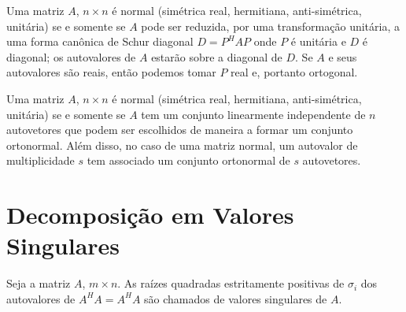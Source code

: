 \documentclass[10pt,a4paper]{article}
\begin{document}
\begin{theorem}\label{Schur Diagonal}
	Uma matriz $A$, $n \times n$ é normal (simétrica real, hermitiana, anti-simétrica, unitária) se e somente se $A$ pode ser reduzida, por uma transformação unitária, a uma forma canônica de Schur diagonal $D = P^HAP$ onde $P$ é unitária e $D$ é diagonal; os autovalores de $A$ estarão sobre a diagonal de $D$. Se $A$ e seus autovalores são reais, então podemos tomar $P$ real e, portanto ortogonal.
\end{theorem}

\begin{theorem}
	Uma matriz $A$, $n \times n$ é normal (simétrica real, hermitiana, anti-simétrica, unitária) se e somente se $A$ tem um conjunto linearmente independente de $n$ autovetores que podem ser escolhidos de maneira a formar um conjunto ortonormal. Além disso, no caso de uma matriz normal, um autovalor de multiplicidade $s$ tem associado um conjunto ortonormal de $s$ autovetores.
\end{theorem}

\section{Decomposição em Valores Singulares}

\begin{definition}\label{Valores Singulares} Seja a matriz $A$, $m \times n$. As raízes quadradas estritamente positivas de $\sigma_i$ dos autovalores de $A^HA = A^HA$ são chamados de valores singulares de $A$.
\end{definition}
\end{document}
